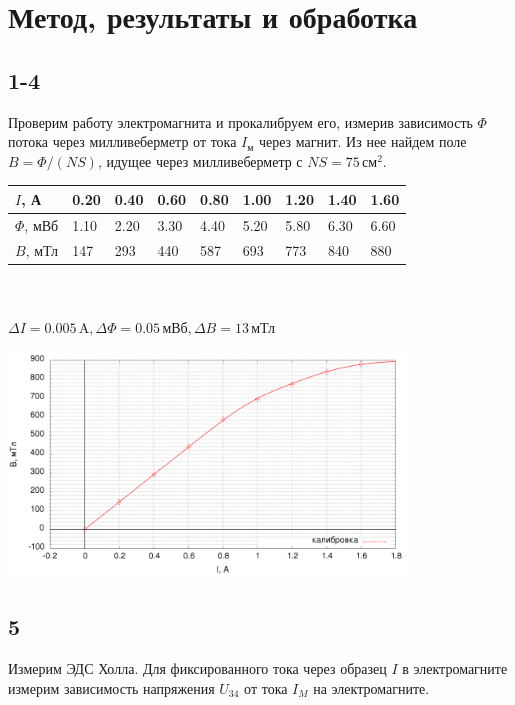 \section*{Метод, результаты и обработка}
\subsection*{1-4}
Проверим работу электромагнита и прокалибруем его, измерив зависимость $\Phi$ потока через милливеберметр от тока $I_\text{м}$ через магнит. Из нее найдем поле $B = \Phi / (NS)$, идущее через милливеберметр с $NS = 75\,\text{см}^2$.

\begin{center}
\begin{tabular}{|l|l|l|l|l|l|l|l|l|}\hline
$I$, А & 0.20 & 0.40 & 0.60 & 0.80 & 1.00 & 1.20 & 1.40 & 1.60 \\ \hline
$\Phi$, мВб & 1.10 & 2.20 & 3.30 & 4.40 & 5.20 & 5.80 & 6.30 & 6.60 \\ \hline
$B$, мТл & 147 & 
293 & 440 & 587 & 693 & 773 & 840 & 880 \\ \hline
\end{tabular}\\~\\
$\Delta I=0.005\,\text{A}, \Delta \Phi=0.05\,\text{мВб}, \Delta B=13\,\text{мТл}$
\end{center}
\begin{center}
\includegraphics[width=0.80\textwidth]{calib.png}
\end{center}
\subsection*{5}
Измерим ЭДС Холла. Для фиксированного тока через образец $I$ в электромагните измерим зависимость напряжения $U_{34}$ от тока $I_M$ на электромагните.

